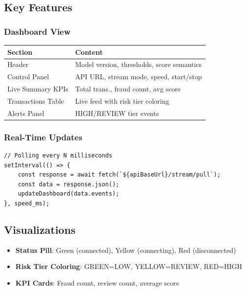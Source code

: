 \documentclass[12pt,a4paper]{article}
\begin{document}
\subsection{Key Features}

\subsubsection{Dashboard View}

\begin{table}[H]
\centering
\small
\begin{tabular}{|l|l|}
\hline
\textbf{Section} & \textbf{Content} \\
\hline
Header & Model version, thresholds, score semantics \\
Control Panel & API URL, stream mode, speed, start/stop \\
Live Summary KPIs & Total trans., fraud count, avg score \\
Transactions Table & Live feed with risk tier coloring \\
Alerts Panel & HIGH/REVIEW tier events \\
\hline
\end{tabular}
\end{table}

\subsubsection{Real-Time Updates}

\begin{lstlisting}
// Polling every N milliseconds
setInterval(() => {
    const response = await fetch(`${apiBaseUrl}/stream/pull`);
    const data = response.json();
    updateDashboard(data.events);
}, speed_ms);
\end{lstlisting}

\subsection{Visualizations}

\begin{itemize}
    \item \textbf{Status Pill}: Green (connected), Yellow (connecting), Red (disconnected)
    \item \textbf{Risk Tier Coloring}: GREEN=LOW, YELLOW=REVIEW, RED=HIGH
    \item \textbf{KPI Cards}: Fraud count, review count, average score
\end{itemize}
\end{document}
